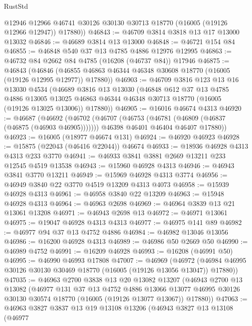 \begin{lexlean}{RustStd}
\begin{coremodule}
        @12946
        @12966
        @46741
        @30126
        @30130
        @30713
        @18770
        (@16005 (@19126 @12966 @12947))
        @17880))
@46843 := @46709 @3814 @3818 @13 @17 @13000 @13032
@46846 := @46689 @3814 @13 @13000
@46848 := @46721 @154 @84
@46855 := @46848 @540 @37 @13 @4785 @4886 @12976 @12995
@46863 := @46732 @84 @2662 @84 @4785 (@16208 (@46737 @84)) @17946
@46875 := @46843
    (@46846 (@46855 @46863 @46344 @46348 @30608 @18770 (@16005 (@19126 @12995 @12977)) @17880))
@46903 := @46709
    @3816
    @123
    @13
    @16
    @13030
    @4534
    (@46689
      @3816
      @13
      @13030
      (@46848
        @612
        @37
        @13
        @4785
        @4886
        @13005
        @13025
        @46863
        @46344
        @46348
        @30713
        @18770
        (@16005 (@19126 @13025 @13006))
        @17880))
@46905 := @16016 @46674 @4313
@46920 := @46687
    (@46692
      (@46702
        (@46707 (@46753 (@46781 (@46809 (@46837 (@46875 (@46903 @46905)))))))
        @46398
        @46401
        @46404
        @46407
        @17880))
@46923 := @16005 (@18977 @46674 @131)
@46924 := @46920 @46923
@46928 := @15875 (@22043 (@46416 @22044)) @46674
@46933 := @18936 @46928 @4313 @4313 @233 @3770
@46941 := @46933 @3841 @3881 @2669 @13211 @233 @12545 @4519 @13538
@46943 := @15960 @46928 @4313
@46946 := @46943 @3841 @3770 @13211
@46949 := @15969 @46928 @4313 @3774
@46956 := @46949 @3840 @22 @3770 @4519 @13209 @4313 @4073
@46958 := @15939 @46928 @4313
@46961 := @46958 @3840 @22 @13209
@46963 := @15948 @46928 @4313
@46964 := @46963 @2698
@46969 := @46964 @3839 @13 @21 @13061 @13208
@46971 := @46943 @2698 @13
@46972 := @46971 @13061
@46975 := @19047 @46928 @4313 @4313
@46977 := @46975 @141 @89
@46982 := @46977 @94 @37 @13 @4752 @4886
@46984 := @46982 @13046 @13056
@46986 := @16200 @46928 @4313
@46989 := @46986 @50 @2669 @50
@46990 := @46989 @4752
@46991 := @16209 @46928
@46993 := @16208 (@46991 @50)
@46995 := @46990 @46993 @17808
@47007 := @46969
    (@46972 (@46984 @46995 @30126 @30130 @30469 @18770 (@16005 (@19126 @13056 @13047)) @17880))
@47035 := @46963
    @2700
    @3838
    @13
    @20
    @13082
    @13207
    (@46943
      @2700
      @13
      @13082
      (@46977
        @131
        @37
        @13
        @4752
        @4886
        @13066
        @13077
        @46995
        @30126
        @30130
        @30574
        @18770
        (@16005 (@19126 @13077 @13067))
        @17880))
@47063 := @46963
    @3827
    @3837
    @13
    @19
    @13108
    @13206
    (@46943
      @3827
      @13
      @13108
      (@46977

\end{coremodule}
\end{lexlean}
